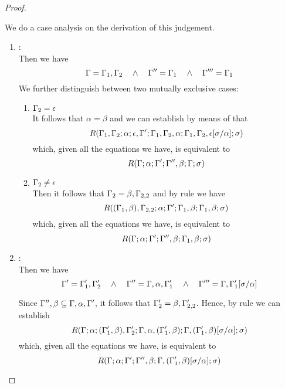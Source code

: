 \begin{proof}
\begin{description}
  We do a case analysis on the derivation of this judgement.
  \begin{enumerate}
  \item {}: \\ Then we have
\begin{equation*}
  \Gamma = \Gamma_1,\Gamma_2 \quad\wedge\quad \Gamma'' = \Gamma_1 \quad\wedge\quad \Gamma''' = \Gamma_1
\end{equation*}
  We further distinguish between two mutually exclusive cases:
  \begin{enumerate}
  \item $\Gamma_2 = \epsilon$ \\
        It follows that $\alpha = \beta$ and we can establish by means of  that
\begin{equation*}
R(\Gamma_1,\Gamma_2;\alpha;\epsilon,\Gamma';\Gamma_1,\Gamma_2,\alpha;\Gamma_1,\Gamma_2,\epsilon[\sigma/\alpha];\sigma)
\end{equation*}
        which, given all the equations we have, is equivalent to
\begin{equation*}
R(\Gamma;\alpha;\Gamma';\Gamma'',\beta;\Gamma;\sigma)
\end{equation*}

  \item $\Gamma_2 \neq \epsilon$ \\
       Then it follows that $\Gamma_2 = \beta,\Gamma_{2,2}$ and by rule  we have
\begin{equation*}
R((\Gamma_1,\beta),\Gamma_{2,2};\alpha;\Gamma';\Gamma_1,\beta;\Gamma_1,\beta;\sigma)
\end{equation*}
        which, given all the equations we have, is equivalent to
\begin{equation*}
R(\Gamma;\alpha;\Gamma';\Gamma'',\beta;\Gamma_1,\beta;\sigma)
\end{equation*}
  \end{enumerate}

  \item {}: \\
   Then we have
\begin{equation*}
  \Gamma' = \Gamma_1',\Gamma_2' \quad\wedge\quad \Gamma'' = \Gamma,\alpha,\Gamma_1' \quad\wedge\quad
      \Gamma''' = \Gamma,\Gamma_1'[\sigma/\alpha]
\end{equation*}

  Since $\Gamma'',\beta \subseteq \Gamma,\alpha,\Gamma'$, it follows that $\Gamma_2' = \beta,\Gamma_{2,2}'$.
  Hence, by rule  we can establish
\begin{equation*}
R(\Gamma;\alpha;(\Gamma_1',\beta),\Gamma_2';\Gamma,\alpha,(\Gamma_1',\beta);\Gamma,(\Gamma_1',\beta)[\sigma/\alpha];\sigma)
\end{equation*}
        which, given all the equations we have, is equivalent to
\begin{equation*}
R(\Gamma;\alpha;\Gamma';\Gamma'',\beta;\Gamma,(\Gamma_1',\beta)[\sigma/\alpha];\sigma)
\end{equation*}
  \end{enumerate}
\end{description}
\end{proof}

